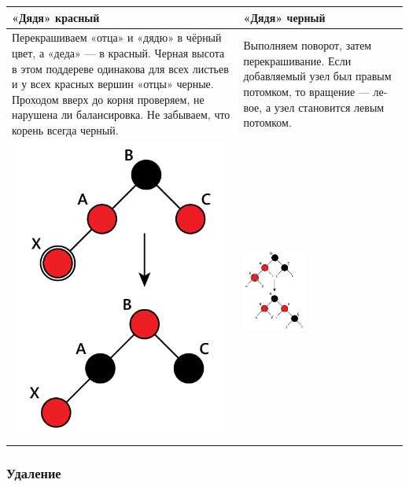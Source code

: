 \begin{table}[hbtp!]
\centering
\begin{tabular}{|m{8cm}|m{8cm}|}
\hline
«Дядя» красный & «Дядя» черный \\ \hline
Перекрашиваем «отца» и «дядю» в чёрный цвет, а «деда» --- в красный.
Черная высота в этом поддереве одинакова для всех листьев и у всех красных вершин «отцы» черные.
Проходом вверх до корня проверяем, не нарушена ли балансировка.
Не забываем, что корень всегда черный. &
Выполняем поворот, затем перекрашивание.
Если добавляемый узел был правым потомком, то вращение --- ле-
вое, а узел становится левым потомком. \\ \hline

\includegraphics[width=0.4 \textwidth]{img/3_1.png} 
&
\includegraphics[width=0.4\textwidth]{img/3_2.png} \\ \hline

\end{tabular}
\end{table}

\subsubsection{Удаление}

